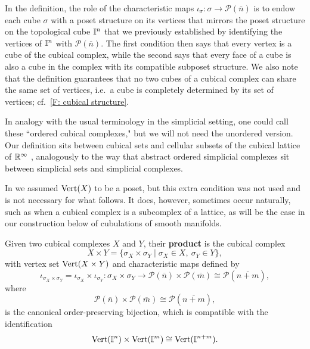 In the definition, the role of the characteristic maps $\iota_\sigma \colon \sigma \to \mathcal P(\overline{n})$ is to endow each cube $\sigma$ with a poset structure on its vertices that mirrors the poset structure on the topological cube $\mathbb{I}^n$ that we previously established by identifying the vertices of $\mathbb{I}^n$ with $\mathcal P(\overline n)$.
The first condition then says that every vertex is a cube of the cubical complex, while the second says that every face of a cube is also a cube in the complex with its compatible subposet structure.
We also note that the definition guarantees that no two cubes of a cubical complex can share the same set of vertices, i.e.\ a cube is completely determined by its set of vertices; cf.\ \cref{F: cubical structure}.

In analogy with the usual terminology in the simplicial setting, one could call these ``ordered cubical complexes," but we will not need the unordered version.
Our definition sits between cubical sets \cite{jardine2002cubical} and cellular subsets of the cubical lattice of $\mathbb{R}^\infty$ \cite{kaczynski2006computational}, analogously to the way that abstract ordered simplicial complexes sit between simplicial sets and simplicial complexes.

\begin{remark}
	In \cite{FMS-flows} we assumed ${\rm Vert}(X)$ to be a poset, but this extra condition was not used and is not necessary for what follows.
	It does, however, sometimes occur naturally, such as when a cubical complex is a subcomplex of a lattice, as will be the case in our construction below of cubulations of smooth manifolds.
\end{remark}

\noindent Given two cubical complexes $X$ and $Y$, their \textbf{product} is the cubical complex
\[
X \times Y = \{ \sigma_X \times \sigma_Y \mid \sigma_X \in X,\ \sigma_Y \in Y \},
\]
with vertex set ${\rm Vert}(X \times Y)$ and characteristic maps defined by
\[
\iota_{\sigma_X \times \sigma_Y} = \iota_{\sigma_X} \times \iota_{\sigma_Y} \colon \sigma_X \times \sigma_Y \to \mathcal{P}(\overline{n}) \times \mathcal{P}(\overline{m}) \cong \mathcal{P}(\overline{n + m}),
\]
where
\[
\mathcal{P}(\overline{n}) \times \mathcal{P}(\overline{m}) \cong \mathcal{P}(\overline{n + m}),
\]
is the canonical order-preserving bijection, which is compatible with the identification
\[
{\rm Vert}(\mathbb{I}^n) \times {\rm Vert}(\mathbb{I}^m) \cong {\rm Vert}(\mathbb{I}^{n + m}).
\]

